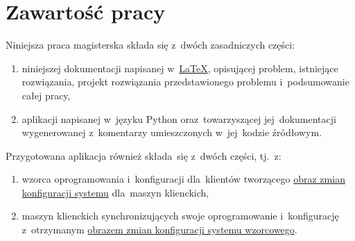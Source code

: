 \documentclass[thesis]{subfiles}
\begin{document}

\section{Zawartość pracy}

\noindent Niniejsza praca magisterska składa się z~dwóch zasadniczych części:\mynobreakpar
\begin{enumerate}
	\item niniejszej dokumentacji napisanej w~\href{https://en.wikipedia.org/wiki/LaTeX}{\LaTeX}, opisującej problem, istniejące rozwiązania, projekt rozwiązania przedstawionego problemu i~podsumowanie całej pracy,
	\item aplikacji napisanej w~języku Python oraz~towarzyszącej jej~dokumentacji wygenerowanej z~komentarzy umieszczonych w~jej~kodzie źródłowym.
\end{enumerate}
Przygotowana aplikacja również składa~się z~dwóch części, tj.~z:\mynobreakpar%
\begin{enumerate}
	\item wzorca oprogramowania i~konfiguracji dla~klientów tworzącego \hyperref[sec:obraz-zmian-konfiguracji]{obraz zmian konfiguracji systemu} dla~maszyn klienckich,
	\item maszyn klienckich synchronizujących swoje oprogramowanie i~konfigurację z~otrzymanym \hyperref[sec:obraz-zmian-konfiguracji]{obrazem zmian konfiguracji systemu wzorcowego}.
\end{enumerate}
\end{document}
